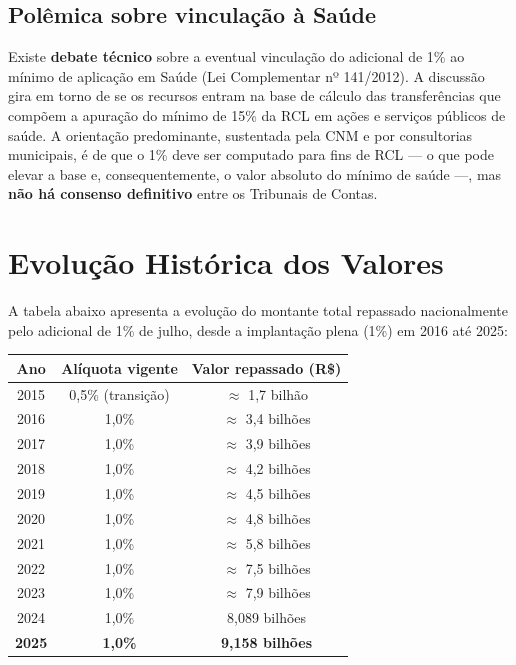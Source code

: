 \documentclass[12pt,a4paper]{article}
\begin{document}
\subsection{Polêmica sobre vinculação à Saúde}

Existe \textbf{debate técnico} sobre a eventual vinculação do adicional de 1\% ao mínimo de aplicação em Saúde (Lei Complementar nº 141/2012). A discussão gira em torno de se os recursos entram na base de cálculo das transferências que compõem a apuração do mínimo de 15\% da RCL em ações e serviços públicos de saúde. A orientação predominante, sustentada pela CNM e por consultorias municipais, é de que o 1\% deve ser computado para fins de RCL --- o que pode elevar a base e, consequentemente, o valor absoluto do mínimo de saúde ---, mas \textbf{não há consenso definitivo} entre os Tribunais de Contas.

\section{Evolução Histórica dos Valores}

A tabela abaixo apresenta a evolução do montante total repassado nacionalmente pelo adicional de 1\% de julho, desde a implantação plena (1\%) em 2016 até 2025:

\begin{center}
\renewcommand{\arraystretch}{1.25}
\begin{tabular}{@{}c c c@{}}
\toprule
\textbf{Ano} & \textbf{Alíquota vigente} & \textbf{Valor repassado (R\$)} \\
\midrule
2015 & 0,5\% (transição) & $\approx$ 1,7 bilhão \\
2016 & 1,0\% & $\approx$ 3,4 bilhões \\
2017 & 1,0\% & $\approx$ 3,9 bilhões \\
2018 & 1,0\% & $\approx$ 4,2 bilhões \\
2019 & 1,0\% & $\approx$ 4,5 bilhões \\
2020 & 1,0\% & $\approx$ 4,8 bilhões \\
2021 & 1,0\% & $\approx$ 5,8 bilhões \\
2022 & 1,0\% & $\approx$ 7,5 bilhões \\
2023 & 1,0\% & $\approx$ 7,9 bilhões \\
2024 & 1,0\% & 8,089 bilhões \\
\textbf{2025} & \textbf{1,0\%} & \textbf{9,158 bilhões} \\
\bottomrule
\end{tabular}
\end{center}
\end{document}
